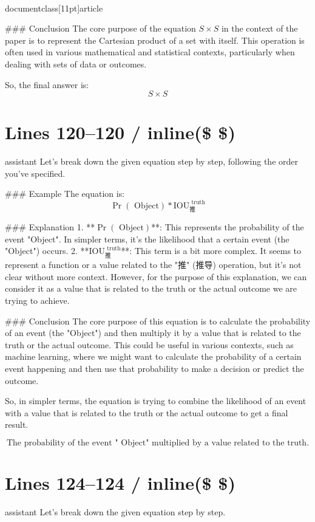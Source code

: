 \\documentclass[11pt]{article}
\begin{document}
### Conclusion
The core purpose of the equation \( S \times S \) in the context of the paper is to represent the Cartesian product of a set with itself. This operation is often used in various mathematical and statistical contexts, particularly when dealing with sets of data or outcomes.

So, the final answer is:
\[ \boxed{S \times S} \]


\section*{Lines 120–120 / inline(\$ \$) }
assistant
Let's break down the given equation step by step, following the order you've specified.

### Example
The equation is:
\[
\Pr(\textrm{ Object}) * \textrm{IOU}_{\textrm{推}}^{\textrm{ truth}}
\]

### Explanation
1. **\(\Pr(\textrm{ Object})\)**: This represents the probability of the event "Object". In simpler terms, it's the likelihood that a certain event (the "Object") occurs.
2. **\(\textrm{IOU}_{\textrm{推}}^{\textrm{ truth}}\)**: This term is a bit more complex. It seems to represent a function or a value related to the "推" (推导) operation, but it's not clear without more context. However, for the purpose of this explanation, we can consider it as a value that is related to the truth or the actual outcome we are trying to achieve.

### Conclusion
The core purpose of this equation is to calculate the probability of an event (the "Object") and then multiply it by a value that is related to the truth or the actual outcome. This could be useful in various contexts, such as machine learning, where we might want to calculate the probability of a certain event happening and then use that probability to make a decision or predict the outcome.

So, in simpler terms, the equation is trying to combine the likelihood of an event with a value that is related to the truth or the actual outcome to get a final result.

\[
\boxed{\text{The probability of the event " Object" multiplied by a value related to the truth.}}
\]


\section*{Lines 124–124 / inline(\$ \$) }
assistant
Let's break down the given equation step by step.
\end{document}
